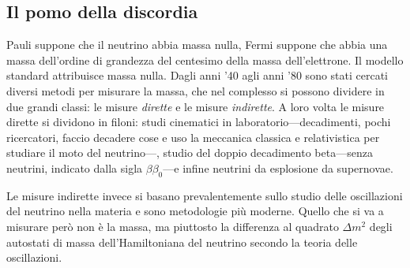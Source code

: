         \subsection{Il pomo della discordia}
            Pauli suppone che il neutrino abbia massa nulla, Fermi suppone che abbia una massa dell'ordine di grandezza del centesimo della massa dell'elettrone. Il modello standard attribuisce massa nulla. Dagli anni '40 agli anni '80 sono stati cercati diversi metodi per misurare la massa, che nel complesso si possono dividere in due grandi classi: le misure \emph{dirette} e le misure \emph{indirette}. A loro volta le misure dirette si dividono in filoni: studi cinematici in laboratorio---decadimenti, pochi ricercatori, faccio decadere cose e uso la meccanica classica e relativistica per studiare il moto del neutrino---, studio del doppio decadimento beta---senza neutrini, indicato dalla sigla $\beta\beta_0$---e infine neutrini da esplosione da supernovae.

            Le misure indirette invece si basano prevalentemente sullo studio delle oscillazioni del neutrino nella materia e sono metodologie più moderne. Quello che si va a misurare però non è la massa, ma piuttosto la differenza al quadrato $\Delta m^2$ degli autostati di massa dell'Hamiltoniana del neutrino secondo la teoria delle oscillazioni.

